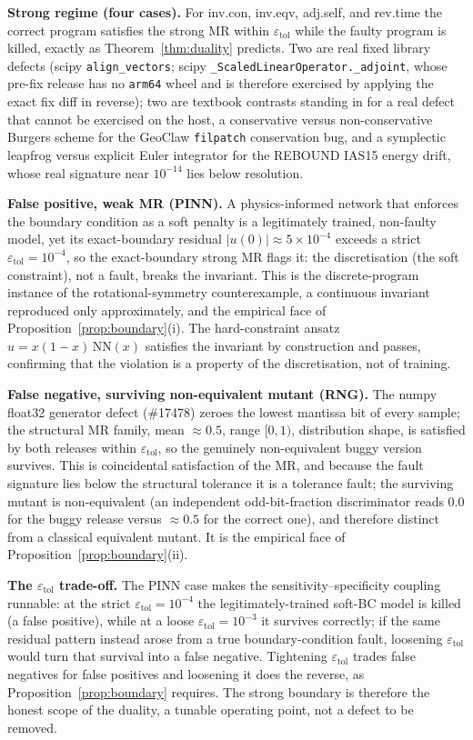 \documentclass[manuscript,screen,review]{acmart}
\begin{document}
\textbf{Strong regime (four cases).} For inv.con, inv.eqv, adj.self, and
rev.time the correct program satisfies the strong MR within
$\varepsilon_{\mathrm{tol}}$ while the faulty program is killed, exactly
as Theorem~\ref{thm:duality} predicts. Two are real fixed library defects (scipy
\texttt{align\_vectors}; scipy \texttt{\_ScaledLinearOperator.\_adjoint},
whose pre-fix release has no \texttt{arm64} wheel and is therefore
exercised by applying the exact fix diff in reverse); two are textbook
contrasts standing in for a real defect that cannot be exercised on the
host, a conservative versus non-conservative Burgers scheme for the
GeoClaw \texttt{filpatch} conservation bug, and a symplectic leapfrog
versus explicit Euler integrator for the REBOUND IAS15 energy drift, whose
real signature near $10^{-14}$ lies below resolution.

\textbf{False positive, weak MR (PINN).} A physics-informed network
that enforces the boundary condition as a soft penalty is a legitimately
trained, non-faulty model, yet its exact-boundary residual
$|u(0)| \approx 5\times10^{-4}$ exceeds a strict
$\varepsilon_{\mathrm{tol}} = 10^{-4}$, so the exact-boundary strong MR
flags it: the discretisation (the soft constraint), not a fault, breaks
the invariant. This is the discrete-program instance of the
rotational-symmetry counterexample, a continuous invariant reproduced
only approximately, and the empirical face of Proposition~\ref{prop:boundary}(i). The
hard-constraint ansatz $u = x(1-x)\,\mathrm{NN}(x)$ satisfies the invariant
by construction and passes, confirming that the violation is a property of
the discretisation, not of training.

\textbf{False negative, surviving non-equivalent mutant (RNG).} The
numpy float32 generator defect (\#17478) zeroes the lowest mantissa bit of
every sample; the structural MR family, mean $\approx 0.5$, range
$[0,1)$, distribution shape, is satisfied by both releases within
$\varepsilon_{\mathrm{tol}}$, so the genuinely non-equivalent buggy version
survives. This is coincidental satisfaction of the MR, and because the
fault signature lies below the structural tolerance it is a tolerance
fault; the surviving mutant is non-equivalent (an independent
odd-bit-fraction discriminator reads $0.0$ for the buggy release versus
$\approx 0.5$ for the correct one), and therefore distinct from a
classical equivalent mutant. It is the empirical face of
Proposition~\ref{prop:boundary}(ii).

\textbf{The $\varepsilon_{\mathrm{tol}}$ trade-off.} The PINN case makes
the sensitivity--specificity coupling runnable: at the strict
$\varepsilon_{\mathrm{tol}} = 10^{-4}$ the legitimately-trained soft-BC
model is killed (a false positive), while at a loose
$\varepsilon_{\mathrm{tol}} = 10^{-3}$ it survives correctly; if the same
residual pattern instead arose from a true boundary-condition fault,
loosening $\varepsilon_{\mathrm{tol}}$ would turn that survival into a
false negative. Tightening
$\varepsilon_{\mathrm{tol}}$ trades false negatives for false positives and
loosening it does the reverse, as Proposition~\ref{prop:boundary} requires. The strong
boundary is therefore the honest scope of the duality, a tunable
operating point, not a defect to be removed.
\end{document}
